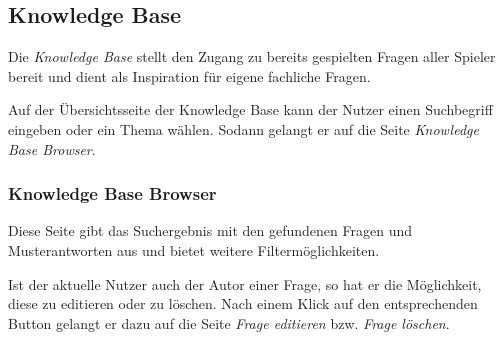 \documentclass[a4paper,11pt,listof=numbered,glossary=totoc,parskip=half,toc=bib]{scrreprt}
\begin{document}
	
	\subsection{Knowledge Base}
	Die \textit{Knowledge Base} stellt den Zugang zu bereits gespielten Fragen aller Spieler bereit und dient als Inspiration für eigene fachliche Fragen.
	
	Auf der Übersichtsseite der Knowledge Base kann der Nutzer einen Suchbegriff eingeben oder ein Thema wählen. Sodann gelangt er auf die Seite \textit{Knowledge Base Browser}.
	
	\subsubsection{Knowledge Base Browser}
	Diese Seite gibt das Suchergebnis mit den gefundenen Fragen und Musterantworten aus und bietet weitere Filtermöglichkeiten.
	
	Ist der aktuelle Nutzer auch der Autor einer Frage, so hat er die Möglichkeit, diese zu editieren oder zu löschen. Nach einem Klick auf den entsprechenden Button gelangt er dazu auf die Seite \textit{Frage editieren} bzw. \textit{Frage löschen}.

	\setcounter{chapter}{0}
	
	
	
\end{document}
